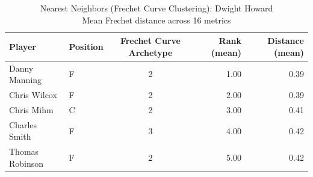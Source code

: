\begin{table}[t]
\caption*{
{\fontsize{20}{25} Nearest Neighbors (Frechet Curve Clustering): Dwight Howard\fontsize{12}{15}\selectfont } \\ 
{\fontsize{14}{17}\selectfont  Mean Frechet distance across 16 metrics\fontsize{12}{15}\selectfont }
} 
\fontsize{12.0pt}{14.0pt}\selectfont
\begin{tabular*}{\linewidth}{@{\extracolsep{\fill}}llcrr}
\toprule
Player & Position & Frechet Curve Archetype & Rank (mean) & Distance (mean) \\ 
\midrule\addlinespace[2.5pt]
Danny Manning & F & 2 & 1.00 & 0.39 \\ 
Chris Wilcox & F & 2 & 2.00 & 0.39 \\ 
Chris Mihm & C & 2 & 3.00 & 0.41 \\ 
Charles Smith & F & 3 & 4.00 & 0.42 \\ 
Thomas Robinson & F & 2 & 5.00 & 0.42 \\ 
\bottomrule
\end{tabular*}
\end{table}

